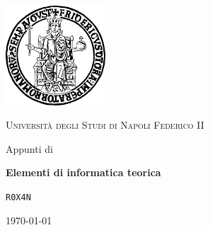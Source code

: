 \documentclass[12pt,a4paper,oneside]{report}
\begin{document}
\begin{titlepage}
  \thispagestyle{empty}
  \begin{center}
    \vspace*{1.0cm}

    \includegraphics[width=0.28\textwidth]{res/uni_logo.pdf}

    \vspace{1.2cm}
    {\Large\textsc{Università degli Studi di Napoli Federico II}\par}

    \vspace{1.2cm}
    {\large Appunti di\par}
    \vspace{0.25cm}
    {\Huge\bfseries\textcolor{uninaPrimary}{Elementi di informatica teorica}\par}

    \vspace{1.4cm}
    {\Large \texttt{\textcolor{uninaPrimary}{R0X4N}}\par}

    \vfill
    {\large \today\par}
  \end{center}
\end{titlepage}

\cleardoublepage
{}
{}
\tableofcontents
\listofteorema
\listofdefinizione

\cleardoublepage




% 
% 
\end{document}
